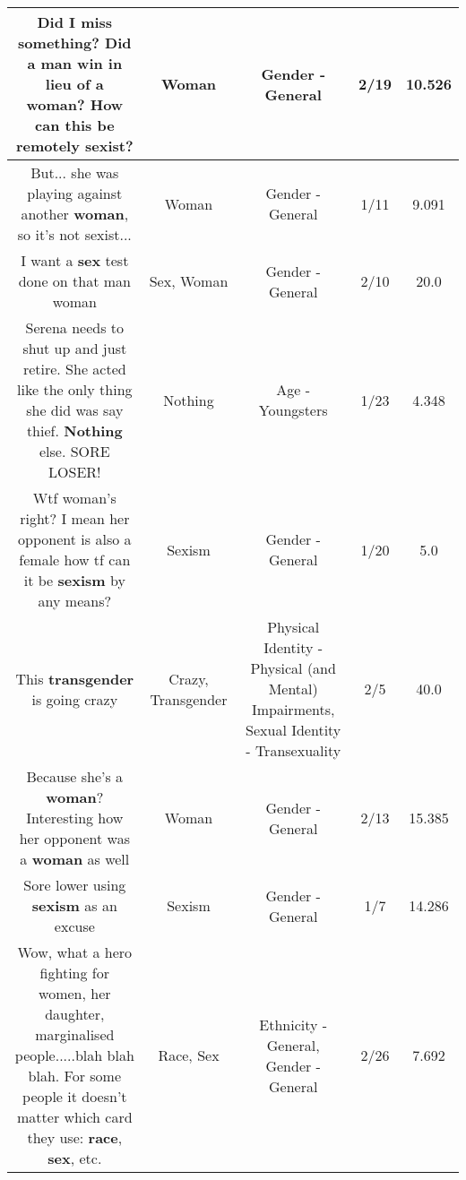 \documentclass[11pt]{article}
\newlength\mylength
\begin{document}
\begin{center}
\begin{longtable}{|C{.65\mylength}|C{.30\mylength}|C{.12\mylength}|C{.12\mylength}|C{.12\mylength}|}
  \small Did I miss something? Did a man win in lieu of a \textbf{woman}? How can this be remotely sexist?\normalsize   & Woman & Gender - General & 2/19 & 10.526 \\  \hline
  \small But... she was playing against another \textbf{woman}, so it's not sexist...\normalsize   & Woman & Gender - General & 1/11 & 9.091 \\  \hline
  \small I want a \textbf{sex} test done on that man woman\normalsize   & Sex, Woman & Gender - General & 2/10 & 20.0 \\  \hline
  \small Serena needs to shut up and just retire. She acted like the only thing she did was say thief. \textbf{Nothing} else. SORE LOSER!\normalsize   & Nothing & Age - Youngsters & 1/23 & 4.348 \\  \hline
  \small Wtf woman's right? I mean her opponent is also a female how tf can it be \textbf{sexism} by any means?\normalsize   & Sexism & Gender - General & 1/20 & 5.0 \\  \hline
  \small This \textbf{transgender} is going crazy\normalsize   & Crazy, Transgender & Physical Identity - Physical (and Mental) Impairments, Sexual Identity - Transexuality & 2/5 & 40.0 \\  \hline
  \small Because she's a \textbf{woman}? Interesting how her opponent was a \textbf{woman} as well\normalsize   & Woman & Gender - General & 2/13 & 15.385 \\  \hline
  \small Sore lower using \textbf{sexism} as an excuse\normalsize   & Sexism & Gender - General & 1/7 & 14.286 \\  \hline
  \small Wow, what a hero fighting for women, her daughter, marginalised people.....blah blah blah. For some people it doesn't matter which card they use: \textbf{race}, \textbf{sex}, etc.\normalsize   & Race, Sex & Ethnicity - General, Gender - General & 2/26 & 7.692 \\  \hline

\end{longtable}
\end{center}
\end{document}
